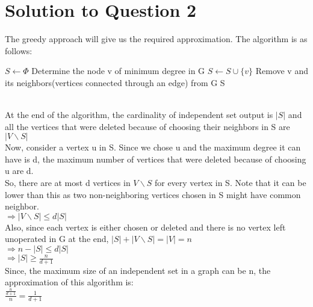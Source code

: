 \documentclass[11pt]{article}
\begin{document}
\section{Solution to Question 2}
The greedy approach will give us the required approximation. The algorithm is as follows:
    \begin{algorithm}
  \begin{algorithmic}
      \State $S \leftarrow \Phi$
          \State Determine the node v of minimum degree in G
          \State $S \leftarrow S \cup \{v\}$
          \State Remove v and its neighbors(vertices connected through an edge) from G
      \EndWhile
      \State \Return S
    \EndFunction
  \end{algorithmic}
\end{algorithm}\\
At the end of the algorithm, the cardinality of independent set output is $|S|$ and all the vertices that were deleted because of choosing their neighbors in S are $|V \backslash S|$ \\
Now, consider a vertex u in S. Since we chose u and the maximum degree it can have is d, the maximum number of vertices that were deleted because of choosing u are d. \\
So, there are at most d vertices in $V \backslash S$ for every vertex in S. Note that it can be lower than this as two non-neighboring vertices chosen in S might have common neighbor. \\
$\Longrightarrow |V \backslash S| \leq d|S| $ \\
Also, since each vertex is either chosen or deleted and there is no vertex left unoperated in G at the end, $|S| + |V \backslash S| = |V| = n$ \\
$\Longrightarrow n - |S| \leq d|S|$ \\
$\Longrightarrow |S| \geq \frac{n}{d+1}$ \\
Since, the maximum size of an independent set in a graph can be n, the approximation of this algorithm is: \\
$\frac{\frac{n}{d+1}}{n} = \frac{1}{d+1}$
\newpage
\end{document}

